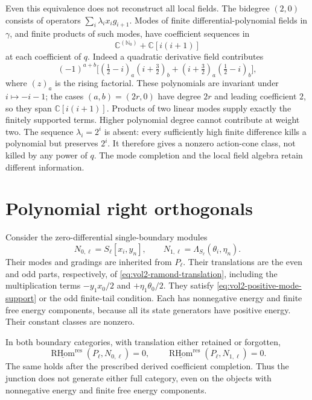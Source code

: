 Even this equivalence does not reconstruct all local fields.
The bidegree \((2,0)\) consists of operators
\(\sum_i\lambda_i x_i g_{i+1}\).
Modes of finite differential-polynomial fields in \(\gamma\),
and finite products of such modes, have coefficient sequences
in
\[
 \mathbb C^{(\mathbb N_0)}+\mathbb C[i(i+1)]
\]
at each coefficient of \(q\). Indeed a quadratic derivative
field contributes
\[
 (-1)^{a+b}
 \bigl[(\tfrac12-i)_a(i+\tfrac32)_b
       +(i+\tfrac32)_a(\tfrac12-i)_b\bigr],
\]
where \((z)_a\) is the rising factorial. These polynomials
are invariant under \(i\mapsto-i-1\); the cases \((a,b)=(2r,0)\)
have degree \(2r\) and leading coefficient \(2\), so they
span \(\mathbb C[i(i+1)]\). Products of two linear modes
supply exactly the finitely supported terms. Higher
polynomial degree cannot contribute at weight two.
The sequence \(\lambda_i=2^i\) is absent: every sufficiently
high finite difference kills a polynomial but preserves
\(2^i\). It therefore gives a nonzero action-cone class,
not killed by any power of \(q\). The mode completion and
the local field algebra retain different information.

\section{Polynomial right orthogonals}
\label{sec:vol2-ramond-orthogonals}

Consider the zero-differential single-boundary modules
\[
 N_{0,\ell}=S_\ell[x_i,y_n],\qquad
 N_{1,\ell}=\Lambda_{S_\ell}(\theta_i,\eta_n).
\]
Their modes and gradings are inherited from \(P_\ell\).
Their translations are the even and odd parts, respectively,
of \eqref{eq:vol2-ramond-translation}, including the
multiplication terms \(-y_1x_0/2\) and \(+\eta_1\theta_0/2\).
They satisfy \eqref{eq:vol2-positive-mode-support} or the
odd finite-tail condition. Each has nonnegative energy and
finite free energy components, because all its state generators
have positive energy. Their constant classes are nonzero.

\begin{theorem}\label{thm:vol2-ramond-nongeneration}
In both boundary categories, with translation either retained
or forgotten,
\[
 \underline{\operatorname{RHom}}^{\mathrm{res}}
          (P_\ell,N_{0,\ell})=0,\qquad
 \underline{\operatorname{RHom}}^{\mathrm{res}}
          (P_\ell,N_{1,\ell})=0.
\]
The same holds after the prescribed derived coefficient
completion. Thus the junction does not generate either full
category, even on the objects with nonnegative energy and
finite free energy components.
\end{theorem}

